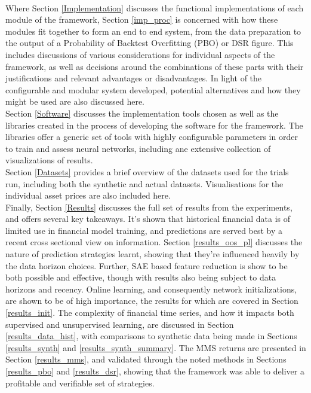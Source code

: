 \documentclass[a4paper,11pt,oneside]{article}
\theoremstyle{plain}
\theoremstyle{definition}
\begin{document}
	~\\\newline
		Where Section \ref{Implementation} discusses the functional implementations of each module of the framework, Section \ref{imp_proc} is concerned with how these modules fit together to form an end to end system, from the data preparation to the output of a Probability of Backtest Overfitting (PBO) or DSR figure. This includes discussions of various considerations for individual aspects of the framework, as well as decisions around the combinations of these parts with their justifications and relevant advantages or disadvantages. In light of the configurable and modular system developed, potential alternatives and how they might be used are also discussed here.
	~\\\newline
		Section \ref{Software} discusses the implementation tools chosen as well as the libraries created in the process of developing the software for the framework. The libraries offer a generic set of tools with highly configurable parameters in order to train and assess neural networks, including ane extensive collection of visualizations of results.
	~\\\newline
		Section \ref{Datasets} provides a brief overview of the datasets used for the trials run, including both the synthetic and actual datasets. Visualisations for the individual asset prices are also included here.
	~\\\newline
		Finally, Section \ref{Results} discusses the full set of results from the experiments, and offers several key takeaways. It's shown that historical financial data is of limited use in financial model training, and predictions are served best by a recent cross sectional view on information. Section \ref{results_oos_pl} discusses the nature of prediction strategies learnt, showing that they're influenced heavily by the data horizon choices. Further, SAE based feature reduction is show to be both possible and effective, though with results also being subject to data horizons and recency. Online learning, and consequently network initializations, are shown to be of high importance, the results for which are covered in Section \ref{results_init}. The complexity of financial time series, and how it impacts both supervised and unsupervised learning, are discussed in Section \ref{results_data_hist}, with comparisons to synthetic data being made in Sections \ref{results_synth} and \ref{results_synth_summary}. The MMS returns are presented in Section \ref{results_mms}, and validated through the noted methods in Sections \ref{results_pbo} and \ref{results_dsr}, showing that the framework was able to deliver a profitable and verifiable set of strategies.
	
\end{document}
